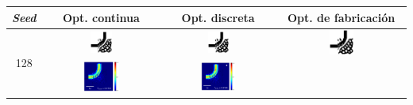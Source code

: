 \begin{table}[ht]
    \centering
    \vspace*{-2.5cm}
    \hspace*{-3cm}
    \begin{tabular}{|c|c|c|c|}
    \hline 
    \emph{Seed} & Opt. continua & Opt. discreta &  Opt. de fabricación \\
    \hline
      \multirow{2}{*}{128} &
      \includegraphics[width=0.20\textwidth]{image/results/bend/PSO/visualize_eps_cont_128.png} &
      \includegraphics[width=0.20\textwidth]{image/results/bend/PSO/visualize_eps_disc_128.png} &
      \includegraphics[width=0.20\textwidth]{image/results/bend/PSO/visualize_eps_fab_128.png} \\
      \cline{2-4}
      &
      \includegraphics[width=0.33\textwidth]{image/results/bend/PSO/visualize_field_cont_128.png} &
      \includegraphics[width=0.33\textwidth]{image/results/bend/PSO/visualize_field_disc_128.png} &

\end{tabular}
\end{table}
